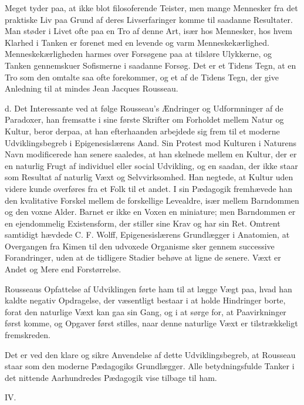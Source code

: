 \documentclass[12pt,a4paper,openany]{book}
\newcommand{\opage}[1]{\marginnote{\footnotesize\textit{[#1]}}}
\begin{document}
Meget tyder paa, at ikke blot filosoferende Teister, men
mange Mennesker fra det praktiske Liv paa Grund af deres
Livserfaringer komme til saadanne Resultater. Man støder i
Livet ofte paa en Tro af denne Art, især hos Mennesker, hos
hvem Klarhed i Tanken er forenet med en levende og varm
Menneskekærlighed. Menneskekærligheden harmes over Forsøgene
paa at tilsløre Ulykkerne, og Tanken gennemskuer Sofismerne
i saadanne Forsøg. Det er et Tidens Tegn, at en
Tro som den omtalte saa ofte forekommer, og et af de Tidens
Tegn, der give Anledning til at mindes Jean Jacques Rousseau.

d. Det Interessante ved at følge Rousseau’s Ændringer
og Udformninger af de Paradoxer, han fremsatte i sine første
\setcounter{footnote}{0}%
\opage{136}Skrifter om Forholdet mellem Natur og Kultur, beror derpaa,
at han efterhaanden arbejdede sig frem til et moderne Udviklingsbegreb
i Epigenesislærens Aand. Sin Protest mod Kulturen
i Naturens Navn modificerede han senere saaledes, at han
skelnede mellem en Kultur, der er en naturlig Frugt af individuel
eller social Udvikling, og en saadan, der ikke staar som
Resultat af naturlig Væxt og Selvvirksomhed. Han negtede, at
Kultur uden videre kunde overføres fra et Folk til et andet.
I sin Pædagogik fremhævede han den kvalitative Forskel mellem
de forskellige Levealdre, især mellem Barndommen og den
voxne Alder. Barnet er ikke en Voxen en miniature; men
Barndommen er en ejendommelig Existensform, der stiller sine
Krav og har sin Ret. Omtrent samtidigt hævdede C. F. Wolff,
Epigenesislærens Grundlægger i Anatomien, at Overgangen fra
Kimen til den udvoxede Organisme sker gennem successive
Forandringer, uden at de tidligere Stadier behøve at ligne de
senere. Væxt er Andet og Mere end Forstørrelse.

Rousseaus Opfattelse af Udviklingen førte ham til at lægge
Vægt paa, hvad han kaldte negativ Opdragelse, der væsentligt
bestaar i at holde Hindringer borte, forat den naturlige Væxt
kan gaa sin Gang, og i at sørge for, at Paavirkninger først
komme, og Opgaver først stilles, naar denne naturlige Væxt er
tilstrækkeligt fremskreden.

Det er ved den klare og sikre Anvendelse af dette Udviklingsbegreb,
at Rousseau staar som den moderne Pædagogiks
Grundlægger. Alle betydningsfulde Tanker i det nittende Aarhundredes
Pædagogik vise tilbage til ham.

\begin{center}IV.\end{center}
\end{document}
